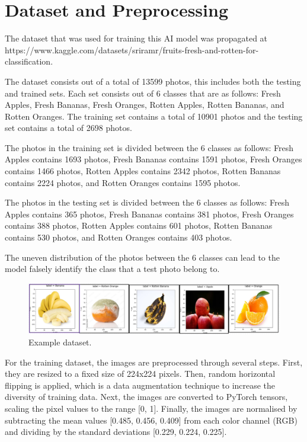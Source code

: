 \documentclass[conference]{IEEEtran}
\begin{document}
\section{Dataset and Preprocessing}

The dataset that was used for training this AI model was propagated at https://www.kaggle.com/datasets/sriramr/fruits-fresh-and-rotten-for-classification.

The dataset consists out of a total of 13599 photos, this includes both the testing and trained sets. Each set consists out of 6 classes that are as follows: Fresh Apples, Fresh Bananas, Fresh Oranges, Rotten Apples, Rotten Bananas, and Rotten Oranges. The training set contains a total of 10901 photos and the testing set contains a total of 2698 photos.

The photos in the training set is divided between the 6 classes as follows: Fresh Apples contains 1693 photos, Fresh Bananas contains 1591 photos, Fresh Oranges contains 1466 photos, Rotten Apples contains 2342 photos, Rotten Bananas contains 2224 photos, and Rotten Oranges contains 1595 photos.

The photos in the testing set is divided between the 6 classes as follows: Fresh Apples contains 365 photos, Fresh Bananas contains 381 photos, Fresh Oranges contains 388 photos, Rotten Apples contains 601 photos, Rotten Bananas contains 530 photos, and Rotten Oranges contains 403 photos.

The uneven distribution of the photos between the 6 classes can lead to the model falsely identify the class that a test photo belong to.

\begin{figure}[h]
    \centering
    \includegraphics[width=\linewidth]{Example data.png}
    \caption{Example dataset.}
    \label{fig}
\end{figure}

For the training dataset, the images are preprocessed through several steps. First, they are resized to a fixed size of 224x224 pixels. Then, random horizontal flipping is applied, which is a data augmentation technique to increase the diversity of training data. Next, the images are converted to PyTorch tensors, scaling the pixel values to the range [0, 1]. Finally, the images are normalised by subtracting the mean values [0.485, 0.456, 0.409] from each color channel (RGB) and dividing by the standard deviations [0.229, 0.224, 0.225].
\end{document}
